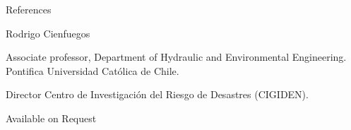 

\prefix{}
\begin{rubric}{References}

{\large Rodrigo Cienfuegos \par Associate professor, Department of Hydraulic and Environmental Engineering. Pontifica Universidad Cat\'olica de Chile. \par Director Centro de Investigaci\'on del Riesgo de Desastres (CIGIDEN). \par}

{\large Available on Request\par}
\end{rubric}